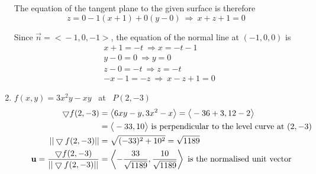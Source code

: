 \documentclass[12pt]{amsart}
\begin{document}
\begin{enumerate}
	The equation of the tangent plane to the given surface is therefore
	$$z=0-1(x+1)+0(y-0) \ \Rightarrow \ x+z+1=0$$
			
	Since $\vec{n}=\big<-1,0,-1\big>$, the equation of the normal line at $(-1,0,0)$ is 
		\begin{align*}
			&x+1=-t \ \Rightarrow x=-t-1 \\
			&y-0=0 \ \Rightarrow y=0 \\
			&z-0=-t \ \Rightarrow z=-t \\
			&-x-1=-z \ \Rightarrow \ x-z+1=0
		\end{align*}
		
		\medskip
		
	\item $f(x,y)=3x^2y-xy$ \ at \ $P(2,-3)$
		\begin{align*}
			\bigtriangledown f(2,-3)&=\big<6xy-y,3x^2-x\big>=\big<-36+3,12-2\big> \\
			&=\big<-33,10\big> \ \text{is perpendicular to the level curve at} \ (2,-3) \\
			||\bigtriangledown f(2,-3)||&=\sqrt{(-33)^2+10^2}=\sqrt{1189} \\
		 	\hspace{.7cm}\mathbf{u}=\frac{\bigtriangledown f(2,-3)}{||\bigtriangledown f(2,-3)||}&=\left<-\frac{33}{\sqrt{1189}},\frac{10}{\sqrt{1189}}\right> \ \text{is the normalised unit vector}
		\end{align*}
					
\end{enumerate}
\end{document}
